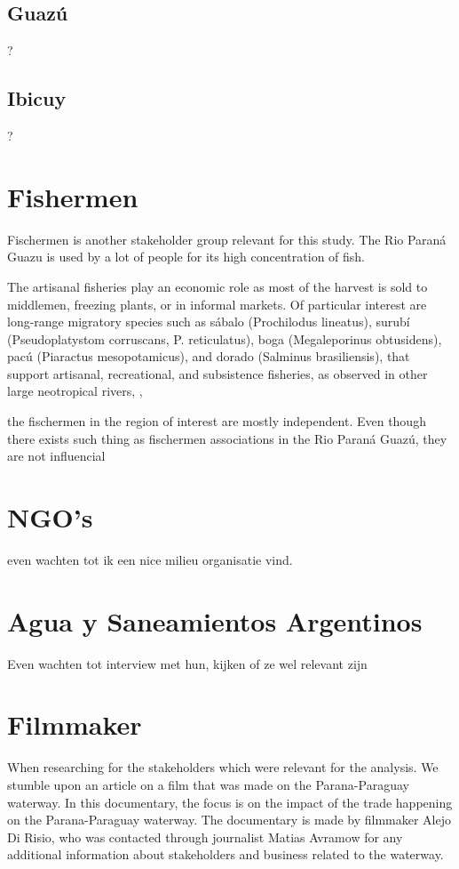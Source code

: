 \subsection{Guazú}
?
\subsection{Ibicuy}
?

\section{Fishermen}
Fischermen is another stakeholder group relevant for this study. The Rio Paraná Guazu is used by a lot of people for its high concentration of fish. 

The artisanal fisheries play an economic role as most of the harvest is sold to middlemen, freezing plants, or in informal markets. Of particular interest are long-range migratory species such as sábalo (Prochilodus lineatus), surubí (Pseudoplatystom corruscans, P. reticulatus), boga (Megaleporinus obtusidens), pacú (Piaractus mesopotamicus), and dorado (Salminus brasiliensis), that support artisanal, recreational, and subsistence fisheries, as observed in other large neotropical rivers, \autocite{assessment of sabalo}, \autocite{fishers' knowledge}

the fischermen in the region of interest are mostly independent. Even though there exists such thing as fischermen associations in the Rio Paraná Guazú, they are not influencial 



\section{NGO's}
even wachten tot ik een nice milieu organisatie vind.

\section{Agua y Saneamientos Argentinos}
Even wachten tot interview met hun, kijken of ze wel relevant zijn


\section{Filmmaker}

When researching for the stakeholders which were relevant for the analysis. We stumble upon an article on a film that was made on the Parana-Paraguay waterway. In this documentary, the focus is on the impact of the trade happening on the Parana-Paraguay waterway. The documentary is made by filmmaker Alejo Di Risio, who was contacted through journalist Matias Avramow for any additional information about stakeholders and business related to the waterway.

